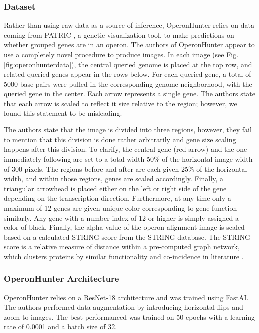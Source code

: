 \documentclass{article}
\begin{document}
\subsubsection{Dataset}

Rather than using raw data as a source of inference, OperonHunter relies on data coming from PATRIC \cite{brettin_rasttk_2015}, a genetic visualization tool, to make predictions on whether grouped genes are in an operon. The authors of OperonHunter appear to use a completely novel procedure to produce images. In each image (see Fig. \ref{fig:operonhunterdata}), the central queried genome is placed at the top row, and related queried genes appear in the rows below. For each queried gene, a total of 5000 base pairs were pulled in the corresponding genome neighborhood, with the queried gene in the center. Each arrow represents a single gene. The authors state that each arrow is scaled to reflect it size relative to the region; however, we found this statement to be misleading.

The authors state that the image is divided into three regions, however, they fail to mention that this division is done rather arbitrarily and gene size scaling happens after this division. To clarify, the central gene (red arrow) and the one immediately following are set to a total width 50\% of the horizontal image width of 300 pixels. The regions before and after are each given 25\% of the horizontal width, and within those regions, genes are scaled accordingly. Finally, a triangular arrowhead is placed either on the left or right side of the gene depending on the transcription direction. Furthermore, at any time only a maximum of 12 genes are given unique color corresponding to gene function similarly. Any gene with a number index of 12 or higher is simply assigned a color of black. Finally, the alpha value of the operon alignment image is scaled based on a calculated STRING score from the STRING database. The STRING score is a relative measure of distance within a pre-computed graph network, which clusters proteins by similar functionality and co-incidence in literature \cite{von_mering_string_2005}.

\subsubsection{OperonHunter Architecture}

OperonHunter relies on a ResNet-18 \cite{he_deep_2015} architecture and was trained using FastAI. The authors performed data augmentation by introducing horizontal flips and zoom to images. The best performanced was trained on 50 epochs with a learning rate of 0.0001 and a batch size of 32.
\end{document}
